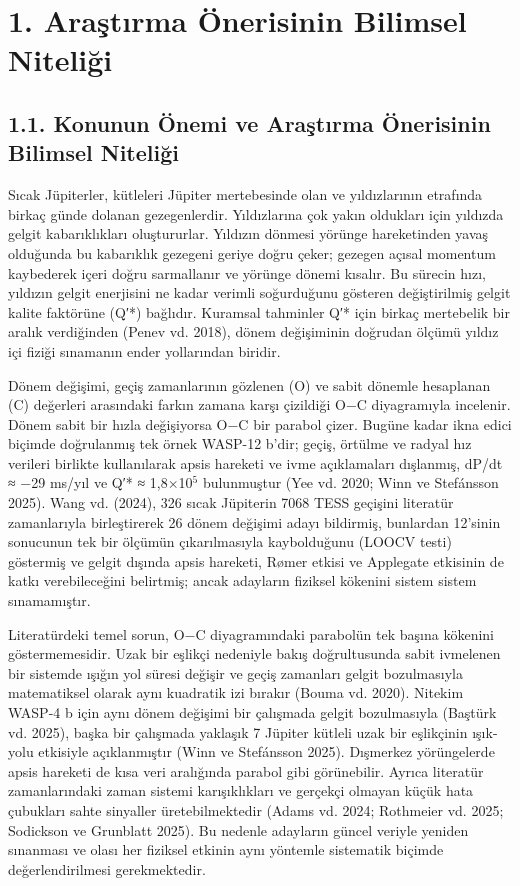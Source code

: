 \section*{1. Araştırma Önerisinin Bilimsel Niteliği}
\subsection*{1.1. Konunun Önemi ve Araştırma Önerisinin Bilimsel Niteliği}
Sıcak Jüpiterler, kütleleri Jüpiter mertebesinde olan ve yıldızlarının etrafında birkaç günde dolanan gezegenlerdir. Yıldızlarına çok yakın oldukları için yıldızda gelgit kabarıklıkları oluştururlar. Yıldızın dönmesi yörünge hareketinden yavaş olduğunda bu kabarıklık gezegeni geriye doğru çeker; gezegen açısal momentum kaybederek içeri doğru sarmallanır ve yörünge dönemi kısalır. Bu sürecin hızı, yıldızın gelgit enerjisini ne kadar verimli soğurduğunu gösteren değiştirilmiş gelgit kalite faktörüne (Q′*) bağlıdır. Kuramsal tahminler Q′* için birkaç mertebelik bir aralık verdiğinden (Penev vd. 2018), dönem değişiminin doğrudan ölçümü yıldız içi fiziği sınamanın ender yollarından biridir.

Dönem değişimi, geçiş zamanlarının gözlenen (O) ve sabit dönemle hesaplanan (C) değerleri arasındaki farkın zamana karşı çizildiği O$-$C diyagramıyla incelenir. Dönem sabit bir hızla değişiyorsa O$-$C bir parabol çizer. Bugüne kadar ikna edici biçimde doğrulanmış tek örnek WASP-12 b'dir; geçiş, örtülme ve radyal hız verileri birlikte kullanılarak apsis hareketi ve ivme açıklamaları dışlanmış, dP/dt ≈ −29 ms/yıl ve Q′* ≈ 1,8×10$^5$ bulunmuştur (Yee vd. 2020; Winn ve Stefánsson 2025). Wang vd. (2024), 326 sıcak Jüpiterin 7068 TESS geçişini literatür zamanlarıyla birleştirerek 26 dönem değişimi adayı bildirmiş, bunlardan 12'sinin sonucunun tek bir ölçümün çıkarılmasıyla kaybolduğunu (LOOCV testi) göstermiş ve gelgit dışında apsis hareketi, Rømer etkisi ve Applegate etkisinin de katkı verebileceğini belirtmiş; ancak adayların fiziksel kökenini sistem sistem sınamamıştır.

Literatürdeki temel sorun, O$-$C diyagramındaki parabolün tek başına kökenini göstermemesidir. Uzak bir eşlikçi nedeniyle bakış doğrultusunda sabit ivmelenen bir sistemde ışığın yol süresi değişir ve geçiş zamanları gelgit bozulmasıyla matematiksel olarak aynı kuadratik izi bırakır (Bouma vd. 2020). Nitekim WASP-4 b için aynı dönem değişimi bir çalışmada gelgit bozulmasıyla (Baştürk vd. 2025), başka bir çalışmada yaklaşık 7 Jüpiter kütleli uzak bir eşlikçinin ışık-yolu etkisiyle açıklanmıştır (Winn ve Stefánsson 2025). Dışmerkez yörüngelerde apsis hareketi de kısa veri aralığında parabol gibi görünebilir. Ayrıca literatür zamanlarındaki zaman sistemi karışıklıkları ve gerçekçi olmayan küçük hata çubukları sahte sinyaller üretebilmektedir (Adams vd. 2024; Rothmeier vd. 2025; Sodickson ve Grunblatt 2025). Bu nedenle adayların güncel veriyle yeniden sınanması ve olası her fiziksel etkinin aynı yöntemle sistematik biçimde değerlendirilmesi gerekmektedir.

